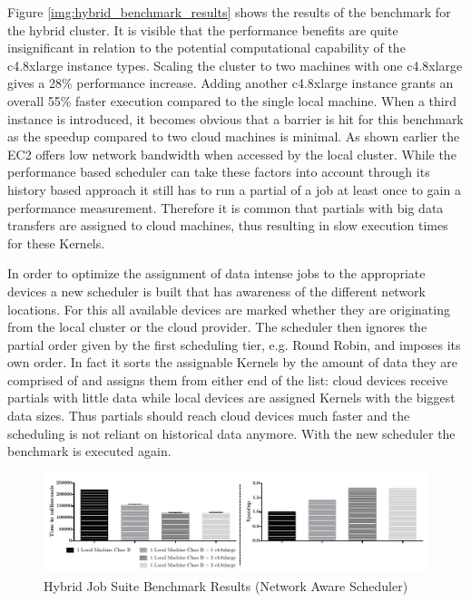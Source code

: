 Figure \ref{img:hybrid_benchmark_results} shows the results of the benchmark for the hybrid cluster. It is visible that the performance benefits are quite insignificant in relation to the potential computational capability of the c4.8xlarge instance types. Scaling the cluster to two machines with one c4.8xlarge gives a 28\% performance increase. Adding another c4.8xlarge instance grants an overall 55\% faster execution compared to the single local machine. When a third instance is introduced, it becomes obvious that a barrier is hit for this benchmark as the speedup compared to two cloud machines is minimal. As shown earlier the EC2 offers low network bandwidth when accessed by the local cluster. While the performance based scheduler can take these factors into account through its history based approach it still has to run a partial of a job at least once to gain a performance measurement. Therefore it is common that partials with big data transfers are assigned to cloud machines, thus resulting in slow execution times for these Kernels. 

In order to optimize the assignment of data intense jobs to the appropriate devices a new scheduler is built that has awareness of the different network locations. For this all available devices are marked whether they are originating from the local cluster or the cloud provider. The scheduler then ignores the partial order given by the first scheduling tier, e.g. Round Robin, and imposes its own order. In fact it sorts the assignable Kernels by the amount of data they are comprised of and assigns them from either end of the list: cloud devices receive partials with little data while local devices are assigned Kernels with the biggest data sizes. Thus partials should reach cloud devices much faster and the scheduling is not reliant on historical data anymore. With the new scheduler the benchmark is executed again.

\begin{figure}[H]	
	\includegraphics[width=1.0\textwidth]{images/hybrid_full_benchmark_network_based.pdf}
	\centering
	\caption{Hybrid Job Suite  Benchmark Results (Network Aware Scheduler)}
	\label{img:hybrid_benchmark_results_network_aware}
\end{figure}

